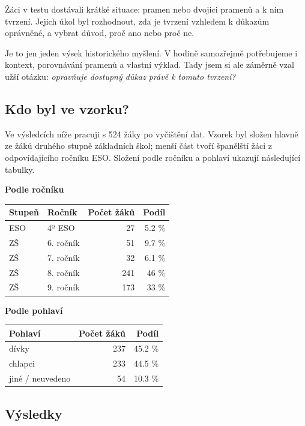 \documentclass[
  12pt,
  english,
  a4paper,
  extrafontsizes,onecolumn,openright
  ]{memoir}
\begin{document}
Žáci v testu dostávali krátké situace: pramen nebo dvojici pramenů a k nim tvrzení.
Jejich úkol byl rozhodnout, zda je tvrzení vzhledem k důkazům oprávněné, a vybrat důvod,
proč ano nebo proč ne.

Je to jen jeden výsek historického myšlení. V hodině samozřejmě potřebujeme
i kontext, porovnávání pramenů a vlastní výklad. Tady jsem si ale záměrně
vzal užší otázku: \emph{opravňuje dostupný důkaz právě k tomuto tvrzení?}

\subsection{Kdo byl ve vzorku?}\label{kdo-byl-ve-vzorku}

Ve výsledcích níže pracuji s 524 žáky po vyčištění dat. Vzorek
byl složen hlavně ze žáků druhého stupně základních škol; menší část tvoří
španělští žáci z odpovídajícího ročníku ESO. Složení podle ročníku a
pohlaví ukazují následující tabulky.

\textbf{Podle ročníku}

\scriptsize

\begin{tabular}{l|l|r|r}
\hline
Stupeň & Ročník & Počet žáků & Podíl\\
\hline
ESO & 4º ESO & 27 & 5.2 \%\\
\hline
ZŠ & 6. ročník & 51 & 9.7 \%\\
\hline
ZŠ & 7. ročník & 32 & 6.1 \%\\
\hline
ZŠ & 8. ročník & 241 & 46 \%\\
\hline
ZŠ & 9. ročník & 173 & 33 \%\\
\hline
\end{tabular}

\normalsize

\textbf{Podle pohlaví}

\scriptsize

\begin{tabular}{l|r|r}
\hline
Pohlaví & Počet žáků & Podíl\\
\hline
dívky & 237 & 45.2 \%\\
\hline
chlapci & 233 & 44.5 \%\\
\hline
jiné / neuvedeno & 54 & 10.3 \%\\
\hline
\end{tabular}

\normalsize

\subsection{Výsledky}\label{vuxfdsledky-1}
\end{document}
